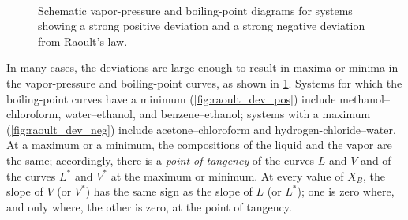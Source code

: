 \begin{figure}[htb]
	\centering
	\\
	\caption{Schematic vapor-pressure and boiling-point diagrams for systems showing \protect{} a strong positive deviation and \protect{} a strong negative deviation from Raoult's law.}
	\label{fig:raoult_deviations}
\end{figure}

In many cases, the deviations are large enough to result in maxima or minima in the vapor-pressure and boiling-point curves, as shown in \cref{fig:raoult_deviations}. 
Systems for which the boiling-point curves have a minimum (\cref{fig:raoult_dev_pos}) include methanol--chloroform, water--ethanol, and benzene--ethanol; systems with a maximum (\cref{fig:raoult_dev_neg}) include acetone--chloroform and hydrogen-chloride--water. 
At a maximum or a minimum, the compositions of the liquid and the vapor are the same; accordingly, there is a \emph{point of tangency} of the curves \(L\) and \(V\) and of the curves \(L^*\) and \(V^*\) at the maximum or minimum. 
At every value of \(X_B\), the slope of \(V\) (or \(V^*\)) has the same sign as the slope of \(L\) (or \(L^*\)); one is zero where, and only where, the other is zero, at the point of tangency.

